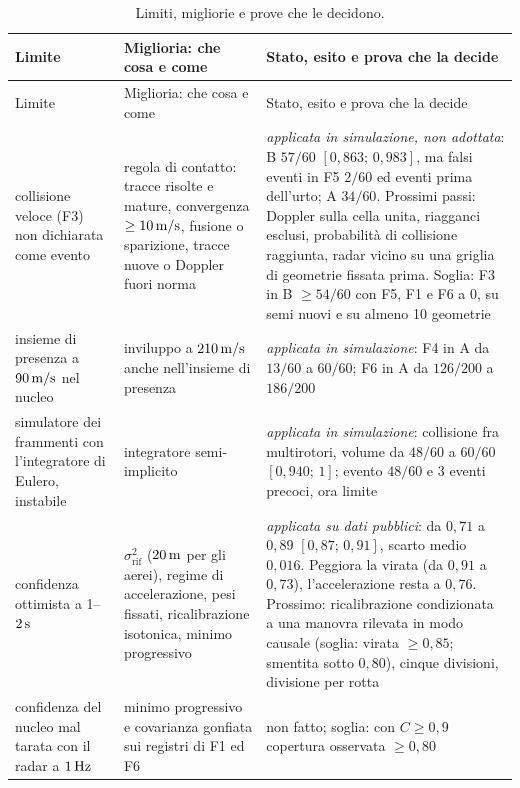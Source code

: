 {\footnotesize\setlength{\tabcolsep}{4pt}
\begin{longtable}{@{}>{\RaggedRight\arraybackslash}p{3.3cm}>{\RaggedRight\arraybackslash}p{5.6cm}>{\RaggedRight\arraybackslash}p{5.8cm}@{}}
\caption{Limiti, migliorie e prove che le decidono.}\label{tab:ps-migliorie}\\
\toprule
Limite & Miglioria: che cosa e come & Stato, esito e prova che la decide\\
\midrule
\endfirsthead
\toprule
Limite & Miglioria: che cosa e come & Stato, esito e prova che la decide\\
\midrule
\endhead
\bottomrule
\endfoot
collisione veloce (F3) non dichiarata come evento & regola di contatto: tracce risolte e mature, convergenza $\ge10\,\mathrm{m/s}$, fusione o sparizione, tracce nuove o Doppler fuori norma & \emph{applicata in simulazione, non adottata}: B $57/60$ $[0{,}863;\,0{,}983]$, ma falsi eventi in F5 $2/60$ ed eventi prima dell'urto; A $34/60$. Prossimi passi: Doppler sulla cella unita, riagganci esclusi, probabilità di collisione raggiunta, radar vicino su una griglia di geometrie fissata prima. Soglia: F3 in B $\ge54/60$ con F5, F1 e F6 a 0, su semi nuovi e su almeno 10 geometrie\\
insieme di presenza a $90\,\mathrm{m/s}$ nel nucleo & inviluppo a $210\,\mathrm{m/s}$ anche nell'insieme di presenza & \emph{applicata in simulazione}: F4 in A da $13/60$ a $60/60$; F6 in A da $126/200$ a $186/200$\\
simulatore dei frammenti con l'integratore di Eulero, instabile & integratore semi-implicito & \emph{applicata in simulazione}: collisione fra multirotori, volume da $48/60$ a $60/60$ $[0{,}940;\,1]$; evento $48/60$ e 3 eventi precoci, ora limite\\
confidenza ottimista a 1--$2\,\mathrm{s}$ & $\sigma_{\mathrm{rif}}^2$ ($20\,\mathrm{m}$ per gli aerei), regime di accelerazione, pesi fissati, ricalibrazione isotonica, minimo progressivo & \emph{applicata su dati pubblici}: da $0{,}71$ a $0{,}89$ $[0{,}87;\,0{,}91]$, scarto medio $0{,}016$. Peggiora la virata (da $0{,}91$ a $0{,}73$), l'accelerazione resta a $0{,}76$. Prossimo: ricalibrazione condizionata a una manovra rilevata in modo causale (soglia: virata $\ge0{,}85$; smentita sotto $0{,}80$), cinque divisioni, divisione per rotta\\
confidenza del nucleo mal tarata con il radar a $1\,\mathrm{Hz}$ & minimo progressivo e covarianza gonfiata sui registri di F1 ed F6 & non fatto; soglia: con $C\ge0{,}9$ copertura osservata $\ge0{,}80$\\

\end{longtable}}
